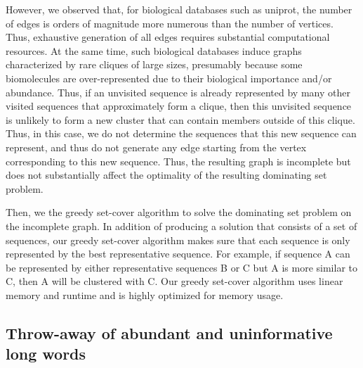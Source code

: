 \documentclass[11pt,letterpaper]{article}
\begin{document}
However, we observed that, for biological databases such as uniprot, the number of edges is orders of magnitude more numerous than the number of vertices. Thus, exhaustive generation of all edges requires substantial computational resources.
At the same time, such biological databases induce graphs characterized by rare cliques of large sizes, presumably because some biomolecules are over-represented due to their biological importance and/or abundance.
Thus, if an unvisited sequence is already represented by many other visited sequences that approximately form a clique, then this unvisited sequence is unlikely to form a new cluster that can contain members outside of this clique. 
Thus, in this case, we do not determine the sequences that this new sequence can represent, and thus do not generate any edge starting from the vertex corresponding to this new sequence. 
Thus, the resulting graph is incomplete but does not substantially affect the optimality of the resulting dominating set problem.

Then, we the greedy set-cover algorithm to solve the dominating set problem on the incomplete graph.
In addition of producing a solution that consists of a set of sequences, 
our greedy set-cover algorithm makes sure that each sequence is only represented by the best representative sequence.
For example, if sequence A can be represented by either representative sequences B or C but A is more similar to C,
then A will be clustered with C.
Our greedy set-cover algorithm uses linear memory and runtime and is highly optimized for memory usage.

\subsection{Throw-away of abundant and uninformative long words}
\end{document}
